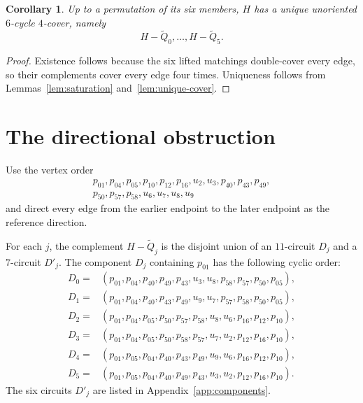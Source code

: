 \documentclass[11pt]{article}
\newtheorem{corollary}[theorem]{Corollary}
\theoremstyle{definition}
\begin{document}
\begin{corollary}\label{cor:unique-6c4c}
Up to a permutation of its six members, $H$ has a unique unoriented
$6$-cycle $4$-cover, namely
\[
H-\widetilde Q_0,\ldots,H-\widetilde Q_5.
\]
\end{corollary}

\begin{proof}
Existence follows because the six lifted matchings double-cover every edge,
so their complements cover every edge four times.  Uniqueness follows from
Lemmas~\ref{lem:saturation} and~\ref{lem:unique-cover}.
\end{proof}

\section{The directional obstruction}

Use the vertex order
\begin{equation}\label{eq:vertex-order}
\begin{split}
p_{01},p_{04},p_{05},p_{10},p_{12},p_{16},u_2,u_3,
p_{40},p_{43},p_{49},{}\\
p_{50},p_{57},p_{58},u_6,u_7,u_8,u_9
\end{split}
\end{equation}
and direct every edge from the earlier endpoint to the later endpoint as the
reference direction.

For each $j$, the complement $H-\widetilde Q_j$ is the disjoint union of an
$11$-circuit $D_j$ and a $7$-circuit $D'_j$.  The component $D_j$ containing
$p_{01}$ has the following cyclic order:
\begin{align*}
D_0={}&(p_{01},p_{04},p_{40},p_{49},p_{43},u_3,u_8,
          p_{58},p_{57},p_{50},p_{05}),\\
D_1={}&(p_{01},p_{04},p_{40},p_{43},p_{49},u_9,u_7,
          p_{57},p_{58},p_{50},p_{05}),\\
D_2={}&(p_{01},p_{04},p_{05},p_{50},p_{57},p_{58},u_8,
          u_6,p_{16},p_{12},p_{10}),\\
D_3={}&(p_{01},p_{04},p_{05},p_{50},p_{58},p_{57},u_7,
          u_2,p_{12},p_{16},p_{10}),\\
D_4={}&(p_{01},p_{05},p_{04},p_{40},p_{43},p_{49},u_9,
          u_6,p_{16},p_{12},p_{10}),\\
D_5={}&(p_{01},p_{05},p_{04},p_{40},p_{49},p_{43},u_3,
          u_2,p_{12},p_{16},p_{10}).
\end{align*}
The six circuits $D'_j$ are listed in Appendix~\ref{app:components}.
\end{document}
